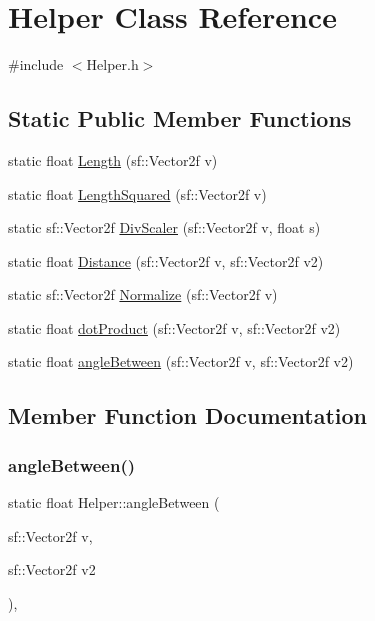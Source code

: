 \hypertarget{class_helper}{}\section{Helper Class Reference}
\label{class_helper}


{\ttfamily \#include $<$Helper.\+h$>$}

\subsection*{Static Public Member Functions}
\begin{DoxyCompactItemize}
\item 
static float \hyperlink{class_helper_ad2b13a8d9fff4f913a57db9903df7709}{Length} (sf\+::\+Vector2f v)
\item 
static float \hyperlink{class_helper_ad6c52dd3a1875fbffc268196a6a6a887}{Length\+Squared} (sf\+::\+Vector2f v)
\item 
static sf\+::\+Vector2f \hyperlink{class_helper_a1a431211d082593425ccfafe077dd5bc}{Div\+Scaler} (sf\+::\+Vector2f v, float s)
\item 
static float \hyperlink{class_helper_aabf497b73c8aedbaf02b0f579ce73704}{Distance} (sf\+::\+Vector2f v, sf\+::\+Vector2f v2)
\item 
static sf\+::\+Vector2f \hyperlink{class_helper_a7565c8f3c91f44e139d7a4aaef6e0e34}{Normalize} (sf\+::\+Vector2f v)
\item 
static float \hyperlink{class_helper_a7a1497494599fe9b5bc68718c812d903}{dot\+Product} (sf\+::\+Vector2f v, sf\+::\+Vector2f v2)
\item 
static float \hyperlink{class_helper_a0a21ce7bbd26f902abbe5fe078b20044}{angle\+Between} (sf\+::\+Vector2f v, sf\+::\+Vector2f v2)
\end{DoxyCompactItemize}


\subsection{Member Function Documentation}
\mbox{\label{class_helper_a0a21ce7bbd26f902abbe5fe078b20044}} 
\subsubsection{\texorpdfstring{angle\+Between()}{angleBetween()}}
{\footnotesize\ttfamily static float Helper\+::angle\+Between (\begin{DoxyParamCaption}\item[{sf\+::\+Vector2f}]{v,  }\item[{sf\+::\+Vector2f}]{v2 }\end{DoxyParamCaption})\hspace{0.3cm}{\ttfamily [inline]}, {\ttfamily [static]}}

